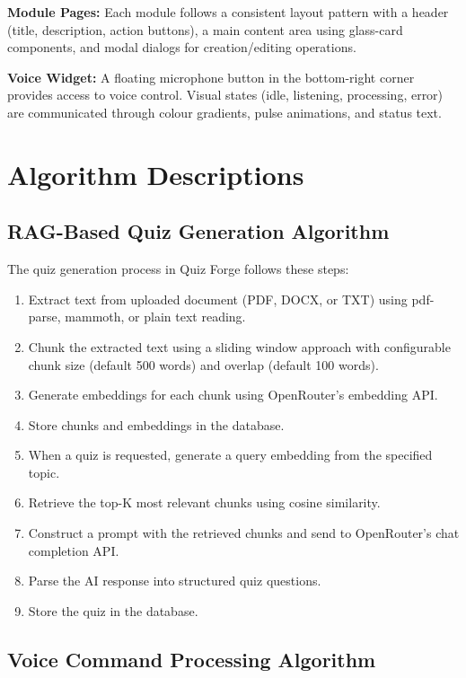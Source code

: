 \documentclass[12pt,a4paper]{report}
\begin{document}
\textbf{Module Pages:} Each module follows a consistent layout pattern with a header (title, description, action buttons), a main content area using glass-card components, and modal dialogs for creation/editing operations.

\textbf{Voice Widget:} A floating microphone button in the bottom-right corner provides access to voice control. Visual states (idle, listening, processing, error) are communicated through colour gradients, pulse animations, and status text.

\section{Algorithm Descriptions}

\subsection{RAG-Based Quiz Generation Algorithm}

The quiz generation process in Quiz Forge follows these steps:

\begin{enumerate}
    \item Extract text from uploaded document (PDF, DOCX, or TXT) using pdf-parse, mammoth, or plain text reading.
    \item Chunk the extracted text using a sliding window approach with configurable chunk size (default 500 words) and overlap (default 100 words).
    \item Generate embeddings for each chunk using OpenRouter's embedding API.
    \item Store chunks and embeddings in the database.
    \item When a quiz is requested, generate a query embedding from the specified topic.
    \item Retrieve the top-K most relevant chunks using cosine similarity.
    \item Construct a prompt with the retrieved chunks and send to OpenRouter's chat completion API.
    \item Parse the AI response into structured quiz questions.
    \item Store the quiz in the database.
\end{enumerate}

\subsection{Voice Command Processing Algorithm}
\end{document}
